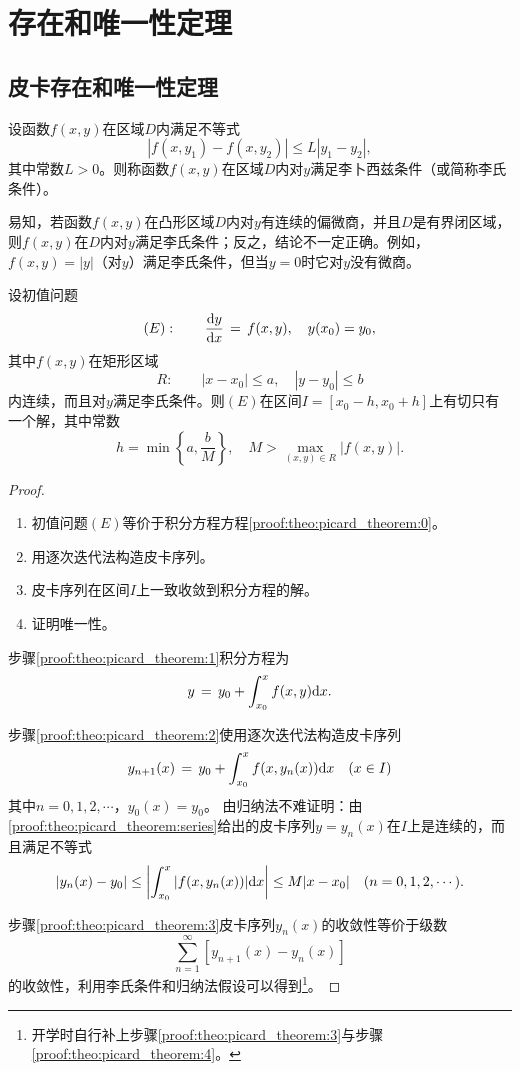 \section{存在和唯一性定理}
\subsection{皮卡存在和唯一性定理}
\begin{defn}\label{def:Libsitz:like:}
设函数$f(x,y)$在区域$D$内满足不等式
$$\left|f(x,y_1)-f(x,y_2)\right|\leq L\left|y_1-y_2\right|,$$
其中常数$L>0$。则称函数$f(x,y)$在区域$D$内对$y$满足{\heiti 李卜西兹条件}（或简称{\heiti 李氏条件}）。
\end{defn}\par
易知，若函数$f(x,y)$在凸形区域$D$内对$y$有连续的偏微商，并且$D$是有界闭区域，则$f(x,y)$在$D$内对$y$满足李氏条件；反之，结论不一定正确。例如，$f(x,y)=\left|y\right|$（对$y$）满足李氏条件，但当$y=0$时它对$y$没有微商。

\begin{theo}\label{theo:picard_theorem}
设初值问题
$$(E):\quad\quad \frac{\mathrm{d}{}y}{\mathrm{d}{}x}\,=\,f(x,y),\quad y(x_0)=y_0,$$
其中$f(x,y)$在矩形区域
$$R:\quad\quad |x-x_0|\leq a,\quad |y-y_0|\leq b$$
内连续，而且对$y$满足李氏条件。则$(E)$在区间$I=[x_0-h,x_0+h]$上有切只有一个解，其中常数
$$h=\min\left\{a,\frac{b}{M}\right\},\quad M>\max_{(x,y)\in R}|f(x,y)|.$$
\end{theo}
\begin{proof}
\begin{enumerate}[(1)]
\item 初值问题$(E)$等价于积分方程方程\eqref{proof:theo:picard_theorem:0}。\label{proof:theo:picard_theorem:1}
\item 用逐次迭代法构造皮卡序列。\label{proof:theo:picard_theorem:2}
\item 皮卡序列在区间$I$上一致收敛到积分方程的解。\label{proof:theo:picard_theorem:3}
\item 证明唯一性。\label{proof:theo:picard_theorem:4}
\end{enumerate}

步骤\eqref{proof:theo:picard_theorem:1}积分方程为
\begin{equation}\label{proof:theo:picard_theorem:0}
y\,=\,y_0+\int_{x_0}^xf(x,y)\mathrm{d} x.
\end{equation}\par
步骤\eqref{proof:theo:picard_theorem:2}使用逐次迭代法构造皮卡序列
\begin{equation}\label{proof:theo:picard_theorem:series}
y_{n+1}(x)\,=\,y_0+\int_{x_0}^xf(x,y_n(x))\mathrm{d} x\quad (x\in I)
\end{equation}
其中$n=0,1,2,\cdots$，$y_0(x)=y_0$。
由归纳法不难证明：由\eqref{proof:theo:picard_theorem:series}给出的皮卡序列$y=y_n(x)$在$I$上是连续的，而且满足不等式
$$|y_n(x)-y_0|\leq\left|\int_{x_0}^x|f(x,y_n(x))|\mathrm{d} x\right|\leq M|x-x_0|\quad (n=0,1,2,\cdots).$$\par
步骤\eqref{proof:theo:picard_theorem:3}皮卡序列$y_n(x)$的收敛性等价于级数
$$\sum_{n=1}^\infty[y_{n+1}(x)-y_n(x)]$$
的收敛性，利用李氏条件和归纳法假设可以得到\footnote{开学时自行补上步骤\eqref{proof:theo:picard_theorem:3}与步骤\eqref{proof:theo:picard_theorem:4}。}。
\end{proof}

